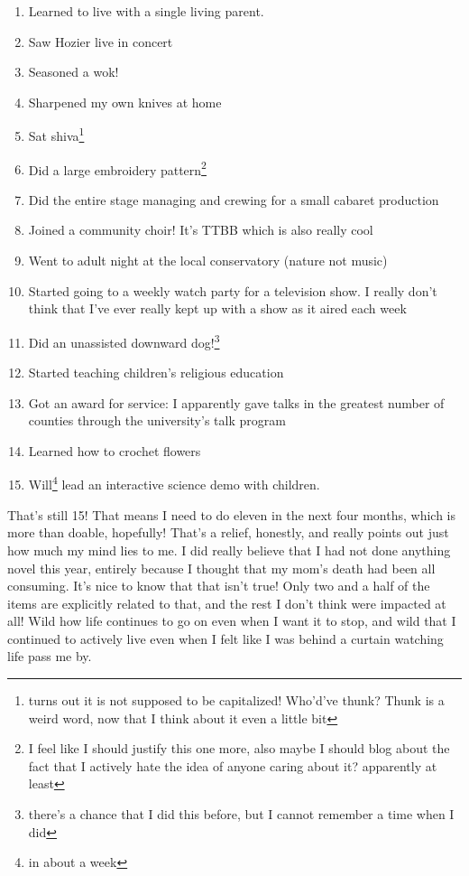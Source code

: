 \documentclass[12pt]{article}[titlepage]
\newcommand{\1}{\={a}}
\newcommand{\2}{\={e}}
\newcommand{\3}{\={\i}}
\newcommand{\4}{\=o}
\newcommand{\5}{\=u}
\newcommand{\6}{\={A}}
\renewcommand{\,}{\textsuperscript{,}}
\begin{document}
\begin{enumerate}  
\item Learned to live with a single living parent.  
\item Saw Hozier live in concert  
\item Seasoned a wok!  
\item Sharpened my own knives at home  
\item Sat shiva\footnote{turns out it is not supposed to be capitalized! Who'd've thunk? Thunk is a weird word, now that I think about it even a little bit}  
\item Did a large embroidery pattern\footnote{I feel like I should justify this one more, also maybe I should blog about the fact that I actively hate the idea of anyone caring about it? apparently at least}  
\item Did the entire stage managing and crewing for a small cabaret production  
\item Joined a community choir! It's TTBB which is also really cool  
\item Went to adult night at the local conservatory (nature not music)  
\item Started going to a weekly watch party for a television show. I really don't think that I've ever really kept up with a show as it aired each week  
\item Did an unassisted downward dog!\footnote{there's a chance that I did this before, but I cannot remember a time when I did}  
\item Started teaching children's religious education  
\item Got an award for service: I apparently gave talks in the greatest number of counties through the university's talk program  
\item Learned how to crochet flowers  
\item Will\footnote{in about a week} lead an interactive science demo with children.  
\end{enumerate}

That's still 15!  
That means I need to do eleven in the next four months, which is more than doable, hopefully!  
That's a relief, honestly, and really points out just how much my mind lies to me.  
I did really believe that I had not done anything novel this year, entirely because I thought that my mom's death had been all consuming.  
It's nice to know that that isn't true!  
Only two and a half of the items are explicitly related to that, and the rest I don't think were impacted at all!  
Wild how life continues to go on even when I want it to stop, and wild that I continued to actively live even when I felt like I was behind a curtain watching life pass me by.
\end{document}
